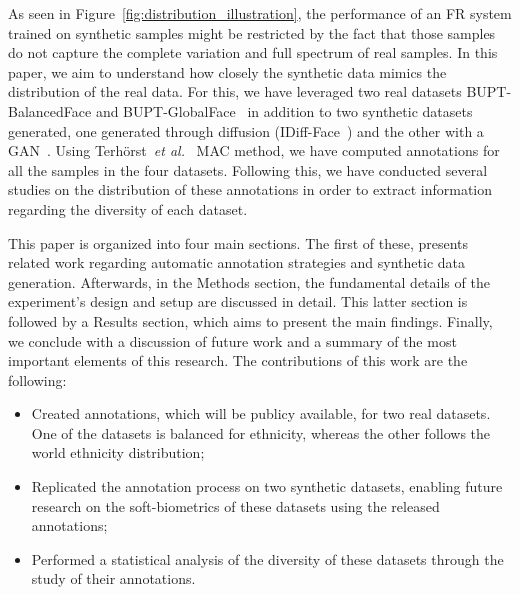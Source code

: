 \documentclass[a4paper, 10pt, conference]{ieeeconf}      %
\begin{document}
As seen in Figure~\ref{fig:distribution_illustration}, the performance of an FR system trained on synthetic samples might be restricted by the fact that those samples do not capture the complete variation and full spectrum of real samples. In this paper, we aim to understand how closely the synthetic data mimics the distribution of the real data. For this, we have leveraged two real datasets BUPT-BalancedFace and BUPT-GlobalFace~\cite{wang2021meta} in addition to two synthetic datasets generated, one generated through diffusion (IDiff-Face~\cite{boutros2023idiff}) and the other with a GAN~\cite{boutros2022quantface}. Using Terhörst~\textit{et al.}~\cite{terhorst2021maadface} MAC method, we have computed annotations for all the samples in the four datasets. Following this, we have conducted several studies on the distribution of these annotations in order to extract information regarding the diversity of each dataset.  

This paper is organized into four main sections. The first of these, presents related work regarding automatic annotation strategies and synthetic data generation. Afterwards, in the Methods section, the fundamental details of the experiment's design and setup are discussed in detail. This latter section is followed by a Results section, which aims to present the main findings. Finally, we conclude with a discussion of future work and a summary of the most important elements of this research.  The contributions of this work are the following: 
\begin{itemize}
    \item Created annotations, which will be publicy available, for two real datasets. One of the datasets is balanced for ethnicity, whereas the other follows the world ethnicity distribution;
    \item Replicated the annotation process on two synthetic datasets, enabling future research on the soft-biometrics of these datasets using the released annotations; 
    \item Performed a statistical analysis of the diversity of these datasets through the study of their annotations. 
\end{itemize}
\end{document}

